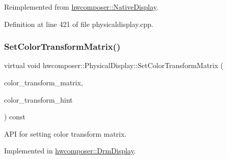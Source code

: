 Reimplemented from \mbox{\hyperlink{classhwcomposer_1_1NativeDisplay_adcce47013e2de6f18ef7384954a95d4e}{hwcomposer\+::\+Native\+Display}}.



Definition at line 421 of file physicaldisplay.\+cpp.


\begin{DoxyCode}{0}
\end{DoxyCode}
\mbox{\label{classhwcomposer_1_1PhysicalDisplay_a89ded7e09902c8c3c707c041412f1c02}} 
\subsubsection{\texorpdfstring{Set\+Color\+Transform\+Matrix()}{SetColorTransformMatrix()}}
{\footnotesize\ttfamily virtual void hwcomposer\+::\+Physical\+Display\+::\+Set\+Color\+Transform\+Matrix (\begin{DoxyParamCaption}\item[{const float $\ast$}]{color\+\_\+transform\+\_\+matrix,  }\item[{\mbox{\hyperlink{hwcdefs_8h_a1a2c55aec4fbd12a1e323f2bdb3e9b88}{H\+W\+C\+Color\+Transform}}}]{color\+\_\+transform\+\_\+hint }\end{DoxyParamCaption}) const\hspace{0.3cm}{\ttfamily [pure virtual]}}

A\+PI for setting color transform matrix. 

Implemented in \mbox{\hyperlink{classhwcomposer_1_1DrmDisplay_a43bbf2421bd4b0b4e7b0612020060e3e}{hwcomposer\+::\+Drm\+Display}}.

\mbox{\label{classhwcomposer_1_1PhysicalDisplay_af88a8e27861d615a2356fb749c3e0c7c}} 
